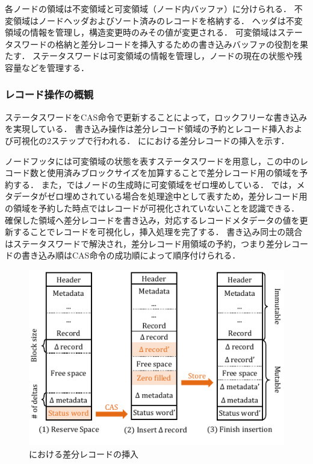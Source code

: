 各ノードの領域は不変領域と可変領域（ノード内バッファ）に分けられる．
不変領域はノードヘッダおよびソート済みのレコードを格納する．
ヘッダは不変領域の情報を管理し，構造変更時のみその値が変更される．
可変領域はステータスワードの格納と差分レコードを挿入するための書き込みバッファの役割を果たす．
ステータスワードは可変領域の情報を管理し，ノードの現在の状態や残容量などを管理する．

\subsubsection{レコード操作の概観}
ステータスワードをCAS命令で更新することによって，ロックフリーな書き込みを実現している．
書き込み操作は差分レコード領域の予約とレコード挿入および可視化の2ステップで行われる．
\Fig{\ref{fig:bc_tree_insertion}}に\Bctree{}における差分レコードの挿入を示す．

ノードフッタには可変領域の状態を表すステータスワードを用意し，この中のレコード数と使用済みブロックサイズを加算することで差分レコード用の領域を予約する．
また，\Bctree{}ではノードの生成時に可変領域をゼロ埋めしている．
\Bctree{}では，メタデータがゼロ埋めされている場合を処理途中として表すため，差分レコード用の領域を予約した時点ではレコードが可視化されていないことを認識できる．
確保した領域へ差分レコードを書き込み，対応するレコードメタデータの値を更新することでレコードを可視化し，挿入処理を完了する．
書き込み同士の競合はステータスワードで解決され，差分レコード用領域の予約，つまり差分レコードの書き込み順はCAS命令の成功順によって順序付けられる．

\begin{figure}[t]
    \centering
    \includegraphics{./figures/Bc-insertion.pdf}
    \caption{\Bctree{}における差分レコードの挿入}
    \label{fig:bc_tree_insertion}
\end{figure}

